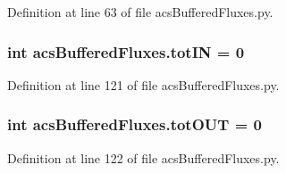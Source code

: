 Definition at line 63 of file acs\-Buffered\-Fluxes.\-py.

\hypertarget{a00098_a59bf56491943c5f1414e0cc407b48b93}{
\subsubsection[{tot\-I\-N}]{\setlength{\rightskip}{0pt plus 5cm}int acs\-Buffered\-Fluxes.\-tot\-I\-N = 0}}\label{a00098_a59bf56491943c5f1414e0cc407b48b93}


Definition at line 121 of file acs\-Buffered\-Fluxes.\-py.

\hypertarget{a00098_a730efee103fd41819ea5848cec249d07}{
\subsubsection[{tot\-O\-U\-T}]{\setlength{\rightskip}{0pt plus 5cm}int acs\-Buffered\-Fluxes.\-tot\-O\-U\-T = 0}}\label{a00098_a730efee103fd41819ea5848cec249d07}


Definition at line 122 of file acs\-Buffered\-Fluxes.\-py.

